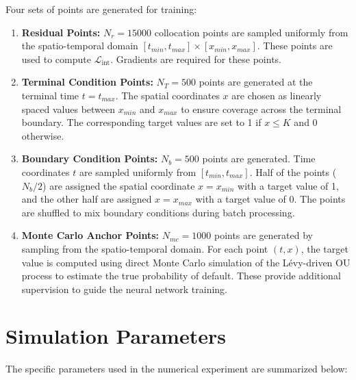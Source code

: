 \documentclass[11pt,twoside,openright]{report}
\begin{document}
Four sets of points are generated for training:
\begin{enumerate}
    \item \textbf{Residual Points:} $N_r = 15000$ collocation points are sampled uniformly from the spatio-temporal domain $[t_{min}, t_{max}] \times [x_{min}, x_{max}]$. These points are used to compute $\mathcal{L}_{\text{int}}$. Gradients are required for these points.
    \item \textbf{Terminal Condition Points:} $N_T = 500$ points are generated at the terminal time $t=t_{max}$. The spatial coordinates $x$ are chosen as linearly spaced values between $x_{min}$ and $x_{max}$ to ensure coverage across the terminal boundary. The corresponding target values are set to 1 if $x \le K$ and 0 otherwise.
    \item \textbf{Boundary Condition Points:} $N_b = 500$ points are generated. Time coordinates $t$ are sampled uniformly from $[t_{min}, t_{max}]$. Half of the points ($N_b/2$) are assigned the spatial coordinate $x=x_{min}$ with a target value of 1, and the other half are assigned $x=x_{max}$ with a target value of 0. The points are shuffled to mix boundary conditions during batch processing.
    \item \textbf{Monte Carlo Anchor Points:} $N_{mc} = 1000$ points are generated by sampling from the spatio-temporal domain. For each point $(t,x)$, the target value is computed using direct Monte Carlo simulation of the Lévy-driven OU process to estimate the true probability of default. These provide additional supervision to guide the neural network training.
\end{enumerate}

\section{Simulation Parameters}
\label{sec:sim_params}

The specific parameters used in the numerical experiment are summarized below:
\end{document}
